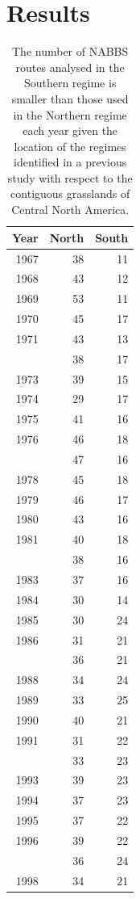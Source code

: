 \documentclass[12pt,twoside,openany]{reedthesis}
\begin{document}
\hypertarget{results-3}{%
\section{Results}\label{results-3}}
\begin{longtable}{rrr}
\caption{\label{tab:nRtesPerRegimePerYearTab}The number of NABBS routes analysed in the Southern regime is smaller than those used in the Northern regime each year given the location of the regimes identified in a previous study with respect to the contiguous grasslands of Central North America.}\\
\toprule
Year & North & South\\
\midrule
1967 & 38 & 11\\
1968 & 43 & 12\\
1969 & 53 & 11\\
1970 & 45 & 17\\
1971 & 43 & 13\\
\addlinespace
1972 & 38 & 17\\
1973 & 39 & 15\\
1974 & 29 & 17\\
1975 & 41 & 16\\
1976 & 46 & 18\\
\addlinespace
1977 & 47 & 16\\
1978 & 45 & 18\\
1979 & 46 & 17\\
1980 & 43 & 16\\
1981 & 40 & 18\\
\addlinespace
1982 & 38 & 16\\
1983 & 37 & 16\\
1984 & 30 & 14\\
1985 & 30 & 24\\
1986 & 31 & 21\\
\addlinespace
1987 & 36 & 21\\
1988 & 34 & 24\\
1989 & 33 & 25\\
1990 & 40 & 21\\
1991 & 31 & 22\\
\addlinespace
1992 & 33 & 23\\
1993 & 39 & 23\\
1994 & 37 & 23\\
1995 & 37 & 22\\
1996 & 39 & 22\\
\addlinespace
1997 & 36 & 24\\
1998 & 34 & 21\\

\end{longtable}
\end{document}
